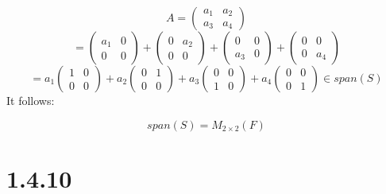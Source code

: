 \documentclass{article}
\begin{document}
\begin{equation*}
   A =  \begin{pmatrix}
  a_{1} & a_{2}\\ 
  a_{3} & a_{4}
    \end{pmatrix}
\end{equation*}
\begin{equation*}
    = \begin{pmatrix} a_{1} & 0\\ 0 & 0 \end{pmatrix} + \begin{pmatrix} 0 & a_{2}\\ 0 & 0 \end{pmatrix}  + \begin{pmatrix} 0 & 0\\ a_{3} & 0 \end{pmatrix}  + \begin{pmatrix} 0 & 0\\ 0 & a_{4} \end{pmatrix}
\end{equation*}
\begin{equation*}
    = a_{1}\begin{pmatrix} 1 & 0\\ 0 & 0 \end{pmatrix} + a_{2}\begin{pmatrix} 0 & 1\\ 0 & 0 \end{pmatrix}  + a_{3}\begin{pmatrix} 0 & 0\\ 1 & 0 \end{pmatrix}  + a_{4}\begin{pmatrix} 0 & 0\\ 0 & 1 \end{pmatrix} \in span(S)
\end{equation*}
It follows:

\begin{equation*}
    span(S) = M_{2 \times 2}(F)
\end{equation*}



\section*{1.4.10}
\end{document}
